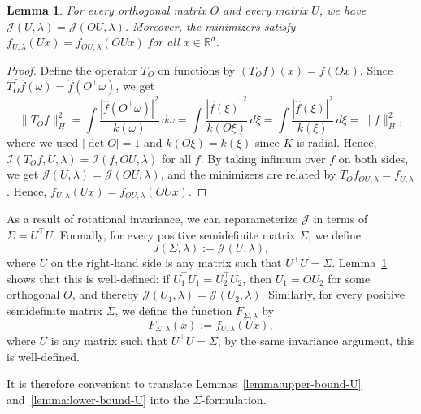\documentclass[sn-mathphys-num]{sn-jnl}%
\numberwithin{equation}{section}
\newcommand{\R}{\mathbb{R}}
\newtheorem{lemma}{Lemma}
\theoremstyle{thmstyleone}%
\theoremstyle{thmstyletwo}%
\theoremstyle{thmstylethree}%
\begin{document}
\vspace{.4em} 
\begin{lemma}
\label{lemma:rotation-invariance}
For every orthogonal matrix $O$ and every matrix $U$, we have
$
\mathcal{J}(U,\lambda)=\mathcal{J}(OU,\lambda)
$.
Moreover, the minimizers satisfy $f_{U, \lambda}(Ux) = f_{OU, \lambda}(OUx)$ for all $x \in \R^d$. 
\end{lemma} 
\begin{proof}
Define the operator $T_O$ on functions by $(T_O f) (x) = f(Ox)$. Since $\widehat{T_Of}(\omega)=\hat f(O^{\top}\omega)$, we get 
\[
\|T_Of\|_{H}^{2}
=\int \frac{|\hat f(O^{\top}\omega)|^{2}}{k(\omega)}\,d\omega
=\int \frac{|\hat f(\xi)|^{2}}{k(O\xi)}\,d\xi
=\int \frac{|\hat f(\xi)|^{2}}{k(\xi)}\,d\xi
=\|f\|_{H}^{2},
\]
where we used $|\det O|=1$ and $k(O\xi)=k(\xi)$ since $K$ is radial. Hence,
$
	\mathcal{I}(T_O f, U, \lambda) 
	 =  \mathcal{I}(f, OU, \lambda)$ for all $f$. 
By taking infimum over $f$ on both sides, we get $\mathcal{J}(U, \lambda) = \mathcal{J}(OU, \lambda)$, 
and the minimizers are related by $T_Of_{OU,\lambda} = f_{U,\lambda}$. Hence, 
$f_{U, \lambda}(Ux) =f_{OU,\lambda}(OUx)$.
\end{proof} 

\vspace{.5em}

As a result of rotational invariance, we can reparameterize $\mathcal{J}$ in terms of $\Sigma = U^\top U$. 
Formally, for every positive semidefinite matrix $\Sigma$, we define
\begin{equation}
\label{eqn:definition-of-J}
  J(\Sigma,\lambda) := \mathcal{J}(U,\lambda),
\end{equation}
where $U$ on the right-hand side is any matrix such that $U^{\top}U = \Sigma$. Lemma~\ref{lemma:rotation-invariance}
shows that this is well-defined: if $U_1^{\top}U_1 = U_2^{\top}U_2$, then $U_1 = OU_2$ for some orthogonal $O$, and thereby
$\mathcal{J}(U_1,\lambda) = \mathcal{J}(U_2,\lambda)$. Similarly, for every positive semidefinite matrix $\Sigma$, we define
the function $F_{\Sigma, \lambda}$ by
\begin{equation}
\label{eqn:definition-of-F}
	F_{\Sigma, \lambda}(x) := f_{U, \lambda}(Ux), %
\end{equation}
where $U$ is any matrix such that $U^\top U=\Sigma$; by the same invariance argument, this is well-defined.

It is therefore convenient to translate Lemmas~\ref{lemma:upper-bound-U} and~\ref{lemma:lower-bound-U}
into the $\Sigma$-formulation.
\end{document}
